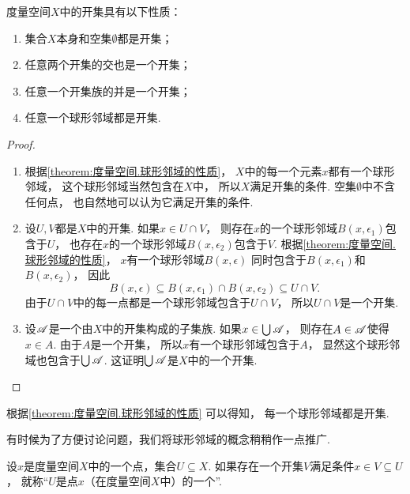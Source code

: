 \begin{theorem}\label{theorem:度量空间.开集的性质}
度量空间\(X\)中的开集具有以下性质：
\begin{enumerate}
	\item 集合\(X\)本身和空集\(\emptyset\)都是开集；
	\item 任意两个开集的交也是一个开集；
	\item 任意一个开集族的并是一个开集；
	\item 任意一个球形邻域都是开集.
\end{enumerate}
\begin{proof}
\begin{enumerate}
	\item 根据\cref{theorem:度量空间.球形邻域的性质}，
	\(X\)中的每一个元素\(x\)都有一个球形邻域，
	这个球形邻域当然包含在\(X\)中，
	所以\(X\)满足开集的条件.
	空集\(\emptyset\)中不含任何点，
	也自然地可以认为它满足开集的条件.

	\item 设\(U,V\)都是\(X\)中的开集.
	如果\(x \in U \cap V\)，
	则存在\(x\)的一个球形邻域\(B(x,\epsilon_1)\)包含于\(U\)，
	也存在\(x\)的一个球形邻域\(B(x,\epsilon_2)\)包含于\(V\).
	根据\cref{theorem:度量空间.球形邻域的性质}，
	\(x\)有一个球形邻域\(B(x,\epsilon)\)
	同时包含于\(B(x,\epsilon_1)\)和\(B(x,\epsilon_2)\)，
	因此\begin{equation*}
		B(x,\epsilon)
		\subseteq
		B(x,\epsilon_1) \cap B(x,\epsilon_2)
		\subseteq
		U \cap V.
	\end{equation*}
	由于\(U \cap V\)中的每一点都是一个球形邻域包含于\(U \cap V\)，
	所以\(U \cap V\)是一个开集.

	\item 设\(\mathscr{A}\)是一个由\(X\)中的开集构成的子集族.
	如果\(x \in \bigcup \mathscr{A}\)，
	则存在\(A \in \mathscr{A}\)使得\(x \in A\).
	由于\(A\)是一个开集，
	所以\(x\)有一个球形邻域包含于\(A\)，
	显然这个球形邻域也包含于\(\bigcup \mathscr{A}\).
	这证明\(\bigcup \mathscr{A}\)是\(X\)中的一个开集.
	\qedhere
\end{enumerate}
\end{proof}
\end{theorem}

根据\cref{theorem:度量空间.球形邻域的性质} 可以得知，
每一个球形邻域都是开集.

有时候为了方便讨论问题，我们将球形邻域的概念稍稍作一点推广.
\begin{definition}\label{definition:度量空间.邻域的概念}
设\(x\)是度量空间\(X\)中的一个点，集合\(U \subseteq X\).
如果存在一个开集\(V\)满足条件\(x \in V \subseteq U\)，
就称“\(U\)是点\(x\)（在度量空间\(X\)中）的一个”.
\end{definition}

